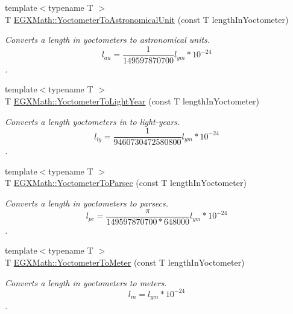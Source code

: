 \begin{DoxyCompactItemize}
\item 
{\footnotesize template$<$typename T $>$ }\\T \mbox{\hyperlink{group___e_g_x_math-_conversions-_length_conversions-_s_i-_yoctometer-_astronomical_ga6963327b8caa5f9a231197768126efc2}{E\+G\+X\+Math\+::\+Yoctometer\+To\+Astronomical\+Unit}} (const T length\+In\+Yoctometer)
\begin{DoxyCompactList}\small\item\em Converts a length in yoctometers to astronomical units. \[ l_{au}= \frac{1}{149597870700} l_{ym} * 10^{-24} \]. \end{DoxyCompactList}\item 
{\footnotesize template$<$typename T $>$ }\\T \mbox{\hyperlink{group___e_g_x_math-_conversions-_length_conversions-_s_i-_yoctometer-_astronomical_gab1406f246c0472c4cef3ee0f5a6b1221}{E\+G\+X\+Math\+::\+Yoctometer\+To\+Light\+Year}} (const T length\+In\+Yoctometer)
\begin{DoxyCompactList}\small\item\em Converts a length yoctometers in to light-\/years. \[ l_{ly}= \frac{1}{9460730472580800} l_{ym} * 10^{-24} \]. \end{DoxyCompactList}\item 
{\footnotesize template$<$typename T $>$ }\\T \mbox{\hyperlink{group___e_g_x_math-_conversions-_length_conversions-_s_i-_yoctometer-_astronomical_ga6856c1dd6b2d31388b4138dcb03bd8ce}{E\+G\+X\+Math\+::\+Yoctometer\+To\+Parsec}} (const T length\+In\+Yoctometer)
\begin{DoxyCompactList}\small\item\em Converts a length in yoctometers to parsecs. \[ l_{pc}=\frac{\pi}{149597870700 * 648000} l_{ym} * 10^{-24} \]. \end{DoxyCompactList}\item 
{\footnotesize template$<$typename T $>$ }\\T \mbox{\hyperlink{group___e_g_x_math-_conversions-_length_conversions-_s_i-_yoctometer-_s_i_ga35b89591930f45660f7dcdae8660b554}{E\+G\+X\+Math\+::\+Yoctometer\+To\+Meter}} (const T length\+In\+Yoctometer)
\begin{DoxyCompactList}\small\item\em Converts a length in yoctometers to meters. \[ l_{m}=l_{ym} * 10^{-24} \]. \end{DoxyCompactList}\item 

\end{DoxyCompactItemize}
